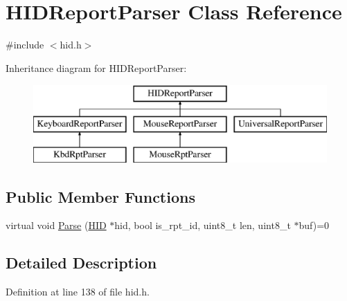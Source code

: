 \hypertarget{class_h_i_d_report_parser}{\section{\-H\-I\-D\-Report\-Parser \-Class \-Reference}
\label{class_h_i_d_report_parser}
}


{\ttfamily \#include $<$hid.\-h$>$}

\-Inheritance diagram for \-H\-I\-D\-Report\-Parser\-:\begin{figure}[H]
\begin{center}
\leavevmode
\includegraphics[height=3.000000cm]{class_h_i_d_report_parser}
\end{center}
\end{figure}
\subsection*{\-Public \-Member \-Functions}
\begin{DoxyCompactItemize}
\item 
virtual void \hyperlink{class_h_i_d_report_parser_ad2837f3d78c7ac3f1c2b3a4815420d97}{\-Parse} (\hyperlink{class_h_i_d}{\-H\-I\-D} $\ast$hid, bool is\-\_\-rpt\-\_\-id, uint8\-\_\-t len, uint8\-\_\-t $\ast$buf)=0
\end{DoxyCompactItemize}


\subsection{\-Detailed \-Description}


\-Definition at line 138 of file hid.\-h.



